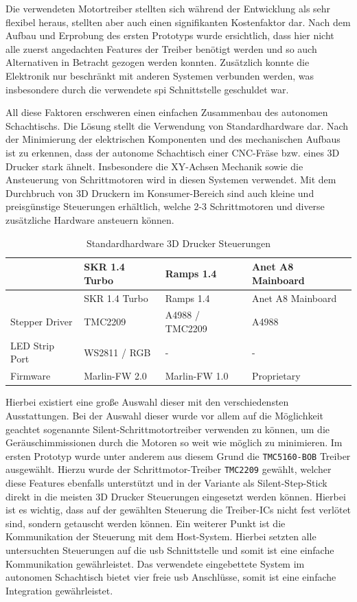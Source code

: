 Die verwendeten Motortreiber stellten sich während der Entwicklung als
sehr flexibel heraus, stellten aber auch einen signifikanten
Kostenfaktor dar. Nach dem Aufbau und Erprobung des ersten Prototyps
wurde ersichtlich, dass hier nicht alle zuerst angedachten Features der
Treiber benötigt werden und so auch Alternativen in Betracht gezogen
werden konnten. Zusätzlich konnte die Elektronik nur beschränkt mit
anderen Systemen verbunden werden, was insbesondere durch die verwendete
\gls{spi} Schnittstelle geschuldet war.

All diese Faktoren erschweren einen einfachen Zusammenbau des autonomen
Schachtischs. Die Lösung stellt die Verwendung von Standardhardware dar.
Nach der Minimierung der elektrischen Komponenten und des mechanischen
Aufbaus ist zu erkennen, dass der autonome Schachtisch einer CNC-Fräse
bzw. eines 3D Drucker stark ähnelt. Insbesondere die XY-Achsen Mechanik
sowie die Ansteuerung von Schrittmotoren wird in diesen Systemen
verwendet. Mit dem Durchbruch von 3D Druckern im Konsumer-Bereich sind
auch kleine und preisgünstige Steuerungen erhältlich, welche 2-3
Schrittmotoren und diverse zusätzliche Hardware ansteuern können.

\begin{longtable}[]{@{}llll@{}}
\caption{Standardhardware 3D Drucker Steuerungen}\tabularnewline
\toprule
& SKR 1.4 Turbo & Ramps 1.4 & Anet A8 Mainboard\tabularnewline
\midrule
\endfirsthead
\toprule
& SKR 1.4 Turbo & Ramps 1.4 & Anet A8 Mainboard\tabularnewline
\midrule
\endhead
Stepper Driver & TMC2209 & A4988 / TMC2209 & A4988\tabularnewline
LED Strip Port & WS2811 / RGB & - & -\tabularnewline
Firmware & Marlin-FW 2.0 & Marlin-FW 1.0 & Proprietary\tabularnewline
\bottomrule
\end{longtable}

Hierbei existiert eine große Auswahl dieser mit den verschiedensten
Ausstattungen. Bei der Auswahl dieser wurde vor allem auf die
Möglichkeit geachtet sogenannte Silent-Schrittmotortreiber verwenden zu
können, um die Geräuschimmissionen durch die Motoren so weit wie möglich
zu minimieren. Im ersten Prototyp wurde unter anderem aus diesem Grund
die \passthrough{\lstinline!TMC5160-BOB!} Treiber ausgewählt. Hierzu
wurde der Schrittmotor-Treiber \passthrough{\lstinline!TMC2209!}
gewählt, welcher diese Features ebenfalls unterstützt und in der
Variante als Silent-Step-Stick direkt in die meisten 3D Drucker
Steuerungen eingesetzt werden können. Hierbei ist es wichtig, dass auf
der gewählten Steuerung die Treiber-ICs nicht fest verlötet sind,
sondern getauscht werden können. Ein weiterer Punkt ist die
Kommunikation der Steuerung mit dem Host-System. Hierbei setzten alle
untersuchten Steuerungen auf die \gls{usb} Schnittstelle und somit ist
eine einfache Kommunikation gewährleistet. Das verwendete eingebettete
System im autonomen Schachtisch bietet vier freie \gls{usb} Anschlüsse,
somit ist eine einfache Integration gewährleistet.

